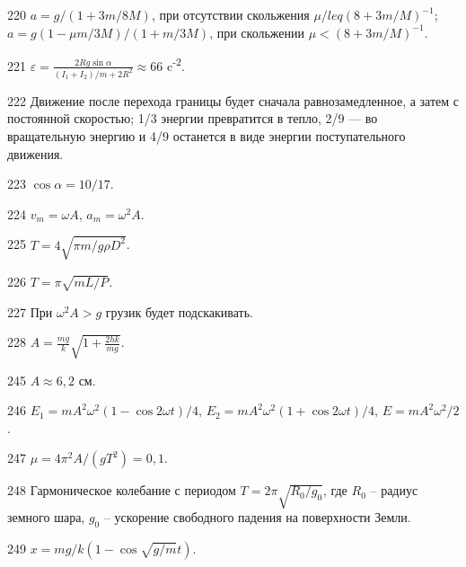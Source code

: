 \begin{Answer}{220}
$a = g/(1+3m/8M)$, при отсутствии скольжения $\mu /leq (8+3m/M)^{-1}$; $a = g(1 - \mu m/3M)/(1+m/3M)$, при скольжении $\mu < (8+3m/M)^{-1}$.
\end{Answer}
\begin{Answer}{221}
$\varepsilon = \frac{2Rg \sin \alpha}{(I_1 + I_2)/m + 2R^2} \approx 66$ c\textsuperscript{-2}.
\end{Answer}
\begin{Answer}{222}
Движение после перехода границы будет сначала равнозамедленное, а затем с постоянной скоростью; 1/3 энергии превратится в тепло, 2/9 — во вращательную энергию и 4/9 останется в виде энергии поступательного движения.
\end{Answer}
\begin{Answer}{223}
$\cos \alpha = 10/17$.
\end{Answer}
\begin{Answer}{224}
$v_m = \omega A$, $a_m = \omega^2 A$.
\end{Answer}
\begin{Answer}{225}
$T = 4 \sqrt{\pi m / g \rho D^2}$.
\end{Answer}
\begin{Answer}{226}
$T = \pi \sqrt{m L /P}$.
\end{Answer}
\begin{Answer}{227}
При $\omega^2 A > g$ грузик будет подскакивать.
\end{Answer}
\begin{Answer}{228}
$A = \frac{mg}{k}\sqrt{ 1 + \frac{2hk}{mg}}$.
\end{Answer}
\begin{Answer}{245}
$A \approx 6,2$ см.
\end{Answer}
\begin{Answer}{246}
$E_1 = m A^2 \omega^2 (1 - \cos 2 \omega t)/4$, $E_2 = m A^2 \omega^2 (1 + \cos 2 \omega t)/4$, $E = m A^2 \omega^2 /2$.
\end{Answer}
\begin{Answer}{247}
$\mu = 4 \pi^2 A / (gT^2) = 0,1$.
\end{Answer}
\begin{Answer}{248}
Гармоническое колебание с периодом $T = 2 \pi \sqrt{R_0 / g_0}$, где $R_0$ -- радиус земного шара, $g_0$ -- ускорение свободного падения на поверхности Земли.
\end{Answer}
\begin{Answer}{249}
$x = mg/k(1-\cos \sqrt{g/m} t)$.
\end{Answer}

